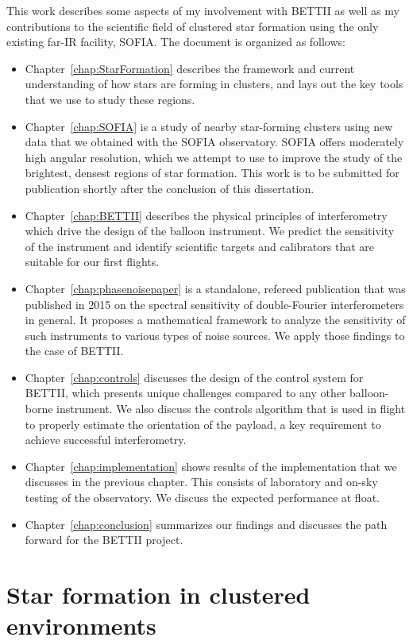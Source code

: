 This work describes some aspects of my involvement with BETTII as well as my contributions to the scientific field of clustered star formation using the only existing far-IR facility, SOFIA. The document is organized as follows:
\begin{itemize}
\item Chapter~\ref{chap:StarFormation} describes the framework and current understanding of how stars are forming in clusters, and lays out the key tools that we use to study these regions.
\item Chapter~\ref{chap:SOFIA} is a study of nearby star-forming clusters using new data that we obtained with the SOFIA observatory. SOFIA offers moderately high angular resolution, which we attempt to use to improve the study of the brightest, densest regions of star formation. This work is to be submitted for publication shortly after the conclusion of this dissertation. 
\item Chapter~\ref{chap:BETTII} describes the physical principles of interferometry which drive the design of the balloon instrument. We predict the sensitivity of the instrument and identify scientific targets and calibrators that are suitable for our first flights.
\item Chapter~\ref{chap:phasenoisepaper} is a standalone, refereed publication that was published in 2015 on the spectral sensitivity of double-Fourier interferometers in general. It proposes a mathematical framework to analyze the sensitivity of such instruments to various types of noise sources. We apply those findings to the case of BETTII.
\item Chapter~\ref{chap:controls} discusses the design of the control system for BETTII, which presents unique challenges compared to any other balloon-borne instrument. We also discuss the controls algorithm that is used in flight to properly estimate the orientation of the payload, a key requirement to achieve successful interferometry.
\item Chapter~\ref{chap:implementation} shows results of the implementation that we discusses in the previous chapter. This consists of laboratory and on-sky testing of the observatory. We discuss the expected performance at float.
\item Chapter~\ref{chap:conclusion} summarizes our findings and discusses the path forward for the BETTII project.
\end{itemize}


\chapter{Star formation in clustered environments} %

